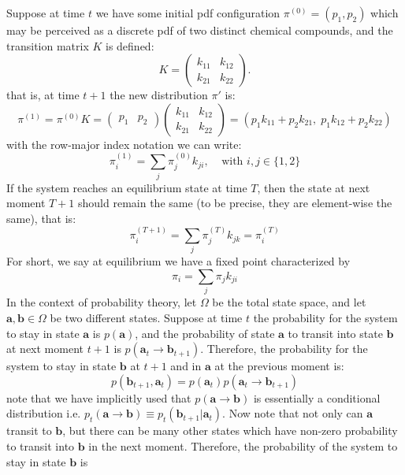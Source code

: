 \documentclass{article}
\begin{document}
Suppose at time $t$ we have some initial pdf configuration $\pi^{(0)} = (p_1, p_2)$ which may be perceived as a discrete pdf of two distinct chemical compounds, and the transition matrix $K$ is defined:
\[
	K=
\begin{pmatrix}
	k_{11} & k_{12} \\ k_{21} & k_{22}
\end{pmatrix}
.\] 
that is, at time $t+1$ the new distribution $\pi'$ is:
\begin{equation}
	\pi^{(1)} = \pi^{(0)} K = 
	\begin{pmatrix}
		p_1 & p_2
	\end{pmatrix}
	\begin{pmatrix}
	k_{11} & k_{12} \\ k_{21} & k_{22}	
	\end{pmatrix}
	= (p_1 k_{11} + p_2 k_{21},\; p_1 k_{12} + p_2 k_{22})
\end{equation}
with the row-major index notation we can write:
\begin{equation}
	\pi_i^{(1)} = \sum_{j} \pi_j^{(0)} k_{ji},\;\;\;\;\text{with } i,j \in \{1,2\}
\end{equation}
If the system reaches an equilibrium state at time $T$, then the state at next moment $T+1$ should remain the same (to be precise, they are element-wise the same), that is:
\begin{equation}
	 \pi_i^{(T+1)} = \sum_{j} \pi_j^{(T)} k_{jk} = \pi_i^{(T)}
\end{equation}
For short, we say at equilibrium we have a fixed point characterized by
\begin{equation}
	\boxed{\pi_i = \sum_{j} \pi_j k_{ji} }
\end{equation}
In the context of probability theory, let $\Omega$ be the total state space, and let $\mathbf{a}, \mathbf{b} \in \Omega$ be two different states. Suppose at time $t$ the probability for the system to stay in state $\mathbf{a}$ is $p(\mathbf{a})$, and the probability of state $\mathbf{a}$ to transit into state $\mathbf{b}$ at next moment $t+1$ is $p(\mathbf{a}_t \rightarrow \mathbf{b}_{t+1})$. Therefore, the probability for the system to stay in state $\mathbf{b}$ at $t+1$ and in $\mathbf{a}$ at the previous moment is:
\begin{equation}
	p(\mathbf{b}_{t+1}, \mathbf{a}_t) = p(\mathbf{a}_t) p(\mathbf{a}_{t} \rightarrow \mathbf{b}_{t+1})
\end{equation}
note that we have implicitly used that  $p(\mathbf{a} \rightarrow \mathbf{b})$ is essentially a conditional distribution i.e. $p_t(\mathbf{a} \rightarrow \mathbf{b})	\equiv p_t(\mathbf{b}_{t+1}|\mathbf{a}_t)$. Now note that not only can $\mathbf{a}$ transit to $\mathbf{b}$, but there can be many other states which have non-zero probability to transit into $\mathbf{b}$ in the next moment. Therefore, the probability of the system to stay in state $\mathbf{b}$ is 
\end{document}
